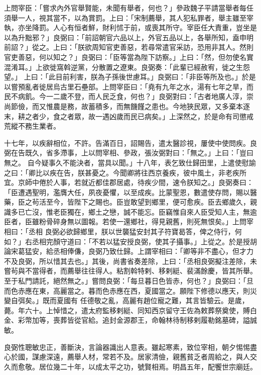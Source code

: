 \begin{pinyinscope}
 上問宰臣：「嘗求內外官舉賢能，未聞有舉者，何也？」參政魏子平請當舉者每任須舉一人，視其當不，以為賞罰。上曰：「宋制薦舉，其人犯私罪者，舉主雖至宰執，亦坐降罰。人心有恒者鮮，財利怵于前，或喪其所守。宰臣任大責重，豈坐是以為升黜邪？」良弼曰：「前詔朝官六品以上，外官五品以上，各舉所知，盍申明前詔？」從之。上曰：「朕欲周知官吏善惡，若尋常遣官采訪，恐用非其人。然則官吏善惡，何以知之？」良弼曰：「臣等當為陛下訪察。」上曰：「然，但勿使名實混淆耳。」上欲徙窩斡逆黨，分散置之遼東。良弼奏：「此輩已經赦宥，徙之生怨望。」
 上曰：「此目前利害，朕為子孫後世慮耳。」良弼曰：「非臣等所及也。」於是以嘗預亂者徙居烏古里石壘部。上問宰臣曰：「堯有九年之水，湯有七年之旱，而民不病飢。今一二歲不登，而人民乏食，何也？」良弼對曰：「古者地廣人淳，崇尚節儉，而又惟農是務，故蓄積多，而無饑饉之患也。今地狹民眾，又多棄本逐末，耕之者少，食之者眾，故一遇凶歲而民已病矣。」上深然之，於是命有司懲戒荒縱不務生業者。



 十七年，以疾辭相位，不許。告滿百日，詔賜告，遣太醫診視，屢使中使問疾。良弼在告既久，省多滯事，上以問宰相、參政，張汝弼對曰：「無之。」上曰：「豈曰無之。
 自今疑事久不能決者，當具以聞。」十八年，表乞致仕歸田里，上遣使慰諭之曰：「卿比以疾在告，朕甚憂之。今聞卿將往西京養疾，彼中風土，非老疾所宜。京師中倦於人事，若就近都佳郡居處，待疾少間，速令朕知之。」良弼奏曰：「臣遭遇聖明，濫膺大任，夙夜憂懼，以至成疾。比蒙聖恩，數遣使存問，賜以醫藥，臣之茍活至今，皆陛下之賜也。臣豈敢望到鄉里，便可愈疾。臣去鄉歲久，親識多已亡沒，惟老臣獨在，鄉土之戀，誠不能忘。臣竊惟自來人臣受知人主，無逾臣者，臣雖粉骨碎身無以圖報。若使一還鄉社，得見親舊，則死無恨矣。」上問宰相曰：「丞相
 良弼必欲歸鄉里，朕以世襲猛安封其子符寶曷答，俾之侍行，何如？」右丞相完顏守道曰：「不若以猛安授良弼，使其子攝事。」上從之。於是授胡論宋葛猛安，給丞相俸傔，良弼乃致仕歸。上謂宰相曰：「卿等非不盡心，但才力不及良弼，所以惜其去也。」其後，尚書省奏差除，上曰：「丞相良弼擬注差除，未嘗茍與不當得者，而薦舉往往得人。粘割斡特剌、移剌綎、裴滿餘慶，皆其所舉。至于私門請託，絕然無之。」嘗問良弼：「每旦暮日色皆赤，何也？」良弼曰：「旦而色赤應在東，高麗當之。暮而色赤應在西，夏國當之。願陛下修德以應天，則災變自弭矣。」既而夏國有
 任德敬之亂，高麗有趙位寵之難，其言皆驗云。是歲，薨。年六十。上悼惜之，遣太府監移剌綎、同知西京留守王佐為敕葬祭奠使，賻白金、彩幣加等，喪葬皆從官給。追封金源郡王，命翰林待制移剌履勒銘墓碑，謚誠敏。



 良弼性聰敏忠正，善斷決，言論器識出人意表。雖起寒素，致位宰相，朝夕惕惕盡心於國，謀慮深遠，薦舉人材，常若不及。居家清儉，親舊貧乏者周給之，與人交久而愈敬。居位幾二十年，以成太平之功，號賢相焉。明昌五年，配饗世宗廟廷。




\end{pinyinscope}
